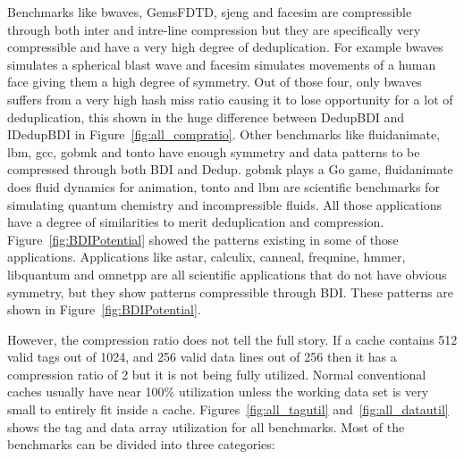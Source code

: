Benchmarks like bwaves, GemsFDTD, sjeng and facesim are compressible through both inter and intre-line compression but they are specifically very compressible and have a very high degree of deduplication. For example bwaves simulates a spherical blast wave and facesim simulates movements of a human face giving them a high degree of symmetry. Out of those four, only bwaves suffers from a very high hash miss ratio causing it to lose opportunity for a lot of deduplication, this shown in the huge difference between DedupBDI and IDedupBDI in Figure~\ref{fig:all_compratio}. Other benchmarks like fluidanimate, lbm, gcc, gobmk and tonto have enough symmetry and data patterns to be compressed through both BDI and Dedup. gobmk plays a Go game, fluidanimate does fluid dynamics for animation, tonto and lbm are scientific benchmarks for simulating quantum chemistry and incompressible fluids. All those applications have a degree of similarities to merit deduplication and compression. Figure~\ref{fig:BDIPotential} showed the patterns existing in some of those applications. Applications like astar, calculix, canneal, freqmine, hmmer, libquantum and omnetpp are all scientific applications that do not have obvious symmetry, but they show patterns compressible through BDI. These patterns are shown in Figure~\ref{fig:BDIPotential}.\par
However, the compression ratio does not tell the full story. If a cache contains 512 valid tags out of 1024, and 256 valid data lines out of 256 then it has a compression ratio of 2 but it is not being fully utilized. Normal conventional caches usually have near 100\% utilization unless the working data set is very small to entirely fit inside a cache. Figures~\ref{fig:all_tagutil} and~\ref{fig:all_datautil} shows the tag and data array utilization for all benchmarks. Most of the benchmarks can be divided into three categories:
